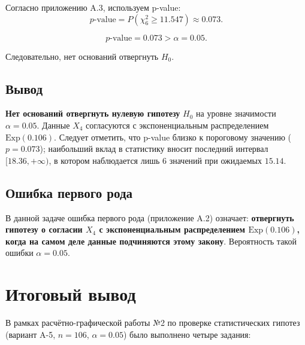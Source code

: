 Согласно приложению A.3, используем p-value:
\[
p\text{-value} = P(\chi^2_6 \geq 11.547) \approx 0.073.
\]

\[
p\text{-value} = 0.073 > \alpha = 0.05.
\]

Следовательно, нет оснований отвергнуть \(H_0\).

\subsection{Вывод}

\textbf{Нет оснований отвергнуть нулевую гипотезу} \(H_0\) на уровне значимости \(\alpha = 0.05\). Данные \(X_4\) согласуются с экспоненциальным распределением \(\text{Exp}(0.106)\). Следует отметить, что p-value близко к пороговому значению (\(p = 0.073\)); наибольший вклад в статистику вносит последний интервал \([18.36, +\infty)\), в котором наблюдается лишь 6 значений при ожидаемых \(15.14\).

\subsection{Ошибка первого рода}

В данной задаче ошибка первого рода (приложение A.2) означает: \textbf{отвергнуть гипотезу о согласии \(X_4\) с экспоненциальным распределением \(\text{Exp}(0.106)\), когда на самом деле данные подчиняются этому закону}. Вероятность такой ошибки \(\alpha = 0.05\).

\section{Итоговый вывод}

В рамках расчётно-графической работы №2 по проверке статистических гипотез (вариант A-5, \(n = 106\), \(\alpha = 0.05\)) было выполнено четыре задания:

